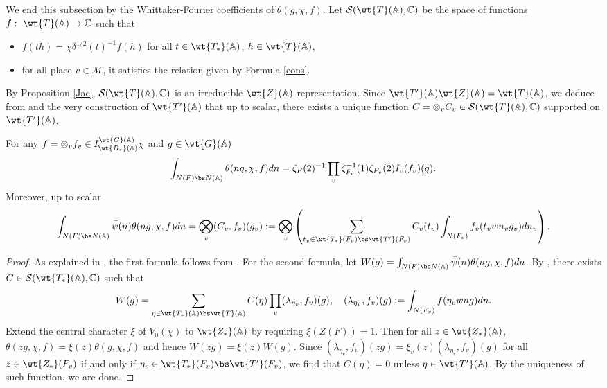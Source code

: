 \documentclass[11pt,reqno]{amsart}
\newcommand{\BA}{{\mathbb {A}}} \newcommand{\BB}{{\mathbb {B}}}
\newcommand{\BC}{{\mathbb {C}}} \newcommand{\BD}{{\mathbb {D}}}
\newcommand{\CM}{{\mathcal {M}}} \newcommand{\CN}{{\mathcal {N}}}
\newcommand{\CS}{{\mathcal {S}}} \newcommand{\CT}{{\mathcal {T}}}
\theoremstyle{plain}
\theoremstyle{remark} \newtheorem{remark}[thm]{Remark}
\theoremstyle{definition} \newtheorem{exercise}[thm]{Exercise}
\theoremstyle{definition} \newtheorem{example}[thm]{Example} \newtheorem{condition}[thm]{Condition}
\numberwithin{equation}{section}
\renewcommand{\-}{\text{--}}
\begin{document}
We end this subsection by  the Whittaker-Fourier coefficients of $\theta(g,\chi,f)$. Let $\CS(\wt{T}(\BA),\BC)$ be the space of functions $f:\ \wt{T}(\BA)\to\BC$ such that
\begin{itemize}
    \item $f(th)=\chi\delta^{1/2}(t)^{-1}f(h)$  for all $t\in \wt{T_*}(\BA)$, $h\in \wt{T}(\BA)$,
    \item for all place $v\in\CM$, it satisfies the relation given by Formula \ref{cons}.
\end{itemize}
By Proposition \ref{Jac}, $\CS(\wt{T}(\BA),\BC)$ is an irreducible $\wt{Z}(\BA)$-representation. Since $\wt{T^\prime}(\BA)\wt{Z}(\BA)=\wt{T}(\BA)$, we deduce from \cite[Corollary I.3.4]{KP84} and the very construction of $\wt{T^\prime}(\BA)$ that up to scalar, there exists a unique function $C=\otimes_v C_v\in \CS(\wt{T}(\BA),\BC)$ supported on $\wt{T^\prime}(\BA)$. 
\begin{prop}\label{Fourier coefficients} For any $f=\otimes_vf_v\in I_{\wt{B_*}(\BA)}^{\wt{G}(\BA)}\chi$ and $g\in \wt{G}(\BA)$
\[\int_{N(F)\bs N(\BA)}\theta(ng,\chi,f)dn=\zeta_F(2)^{-1}\prod_v \zeta_{F_v}^{-1}(1)\zeta_{F_v}(2)I_v(f_v)(g).\]
Moreover, up to scalar \[\int_{N(F)\bs N(\BA)}\bar{\psi}(n)\theta(ng,\chi,f)dn=\bigotimes_v(C_v, f_v)(g_v):=\bigotimes_v\left(\sum_{t_v\in \wt{T_*}(F_v)\bs\wt{T^\prime}(F_v)}C_v(t_v)\int_{N(F_v)}f_v(t_vwn_vg_v)dn_v\right).\]
\end{prop}
\begin{proof}As explained in \cite[Page 114]{KP84}, the first formula follows from \cite[Proposition II.1.2]{KP84}. For the second formula, let $W(g)=\int_{N(F)\bs N(\BA)}\bar{\psi}(n)\theta(ng,\chi,f)dn$. By \cite[Theorem II.2.2]{KP84}, there exists $C\in \CS(\wt{T_*}(\BA),\BC)$ such that 
\[W(g)=\sum_{\eta\in \wt{T_*}(\BA)\bs\wt{T}(\BA)}C(\eta)\prod_v (\lambda_{\eta_v},f_v)(g),\quad (\lambda_{\eta_v},f_v)(g):=\int_{N(F_v)}f(\eta_vwng)dn.\] Extend the central character $\xi$ of $V_0(\chi)$ to $\wt{Z_*}(\BA)$ by requiring $\xi(Z(F))=1$. Then for all $z\in\wt{Z_*}(\BA)$, $\theta(zg,\chi,f)=\xi(z)\theta(g,\chi,f)$ and hence $W(zg)=\xi(z)W(g)$.  Since $(\lambda_{\eta_v},f_v)(zg)=\xi_v(z)(\lambda_{\eta_v},f_v)(g)$ for all $z\in\wt{Z_*}(F_v)$ if and only if $\eta_v\in \wt{T_*}(F_v)\bs \wt{T^\prime}(F_v)$, we find that $C(\eta)=0$ unless $\eta\in \wt{T^\prime}(\BA)$. By the uniqueness of such function, we are done.
\end{proof}
\end{document}
